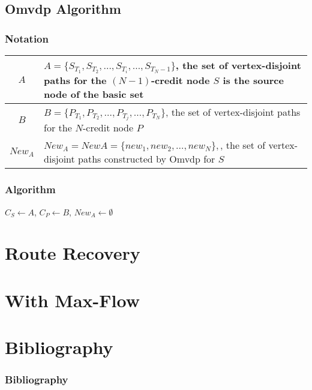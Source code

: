 \documentclass{beamer}
\begin{document}
\subsection{Omvdp Algorithm}
\begin{frame}
\end{frame}
\begin{frame}
  \frametitle{Notation}
  \begin{tabular}{|c|p{22em}|}
    \hline
    $A$&$A = \{S_{T_1}, S_{T_2},\dots, S_{T_i},\dots, S_{T_N-1}\}$, the set of vertex-disjoint paths for the $(N-1)$-credit node $S$ is the source node of the basic set\\
    \hline
    $B$&$B = \{P_{T_1} , P_{T_2} ,\dots, P_{T_j} ,\dots, P_{T_N} \}$, the set of vertex-disjoint paths for the $N$-credit node $P$ \\ 
    \hline
    $New_A$&$New_A = NewA = \{new_1 , new_2 ,\dots, new_N \},$,  the set of vertex-disjoint paths constructed by Omvdp for $S$\\
    \hline
  \end{tabular}
\end{frame}

\begin{frame}[allowframebreaks]
\frametitle{Algorithm}
\begin{algorithmic}
  \STATE $C_S \leftarrow A$, $C_P \leftarrow B$, $New_A \leftarrow \emptyset$
\end{algorithmic}
\end{frame}


\section{Route Recovery}
\section{With Max-Flow}

\section{Bibliography}
\begin{frame}
\frametitle{Bibliography}

\end{frame}
\end{document}
